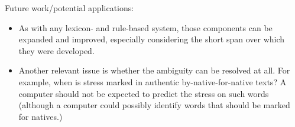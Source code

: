 \documentclass[11pt]{article}
\begin{document}
Future work/potential applications:
\begin{itemize}
\item As with any lexicon- and rule-based system, those components can be expanded and improved, especially considering the short span over which they were developed.
\item Another relevant issue is whether the ambiguity can be resolved at all. For example, when is stress marked in authentic by-native-for-native texts? A computer should not be expected to predict the stress on such words (although a computer could possibly identify words that should be marked for natives.)
\end{itemize}
%



\end{document}
